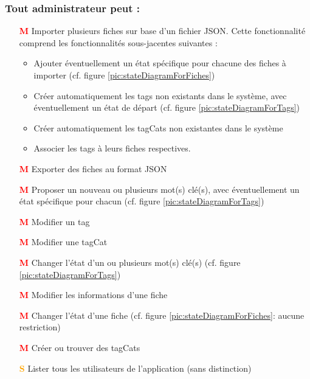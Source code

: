\subsubsection*{Tout administrateur peut : }
\begin{itemize}
    \item[\textcolor{red}{\textbf{M}}] Importer plusieurs \glspl{fiche} sur base d'un fichier JSON.
        Cette fonctionnalité comprend les fonctionnalités sous-jacentes suivantes :
        \begin{itemize}
            \item Ajouter éventuellement un état spécifique pour chacune des \glspl{fiche} à importer (cf. figure \ref{pic:stateDiagramForFiches})
            \item Créer automatiquement les \glspl{tag} non existants dans le système, avec éventuellement un état de départ (cf. figure \ref{pic:stateDiagramForTags})
            \item Créer automatiquement les \glspl{tagCat} non existantes dans le système
            \item Associer les \glspl{tag} à leurs \glspl{fiche} respectives. 
        \end{itemize}
    \item[\textcolor{red}{\textbf{M}}] Exporter des \glspl{fiche} au format JSON
    \item[\textcolor{red}{\textbf{M}}] Proposer un nouveau ou plusieurs mot(s) clé(s), avec éventuellement un état spécifique pour chacun (cf. figure \ref{pic:stateDiagramForTags})
    \item[\textcolor{red}{\textbf{M}}] Modifier un \gls{tag} 
    \item[\textcolor{red}{\textbf{M}}] Modifier une \gls{tagCat} 
    \item[\textcolor{red}{\textbf{M}}] Changer l'état d'un ou plusieurs mot(s) clé(s) (cf. figure \ref{pic:stateDiagramForTags})
    \item[\textcolor{red}{\textbf{M}}] Modifier les informations d'une \gls{fiche} 
    \item[\textcolor{red}{\textbf{M}}] Changer l'état d'une \gls{fiche} (cf. figure \ref{pic:stateDiagramForFiches}: aucune restriction)
    \item[\textcolor{red}{\textbf{M}}] Créer ou trouver des \glspl{tagCat}
    \item[\textcolor{orange}{\textbf{S}}] Lister tous les utilisateurs de l'application (sans distinction)
\end{itemize}

